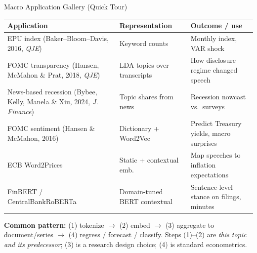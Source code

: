 \begin{frame}{Macro Application Gallery (Quick Tour)}
\begin{center}
\renewcommand{\arraystretch}{1.15}
\scriptsize
\begin{tabular}{|p{3.6cm}|p{4.4cm}|p{5.8cm}|}
\hline
\textbf{Application} & \textbf{Representation} & \textbf{Outcome / use} \\
\hline
EPU index (Baker--Bloom--Davis, 2016, \emph{QJE}) & Keyword counts & Monthly index, VAR shock \\
\hline
FOMC transparency (Hansen, McMahon \& Prat, 2018, \emph{QJE}) & LDA topics over transcripts & How disclosure regime changed speech \\
\hline
News-based recession (Bybee, Kelly, Manela \& Xiu, 2024, \emph{J. Finance}) & Topic shares from news & Recession nowcast vs.\ surveys \\
\hline
FOMC sentiment (Hansen \& McMahon, 2016) & Dictionary + Word2Vec & Predict Treasury yields, macro surprises \\
\hline
ECB Word2Prices & Static + contextual emb. & Map speeches to inflation expectations \\
\hline
FinBERT / CentralBankRoBERTa & Domain-tuned BERT contextual & Sentence-level stance on filings, minutes \\
\hline
\end{tabular}
\end{center}

\smallskip
\textbf{Common pattern:} (1) tokenize $\to$ (2) embed $\to$ (3) aggregate to document/series $\to$ (4) regress / forecast / classify. Steps (1)--(2) are \emph{this topic and its predecessor}; (3) is a research design choice; (4) is standard econometrics.
\end{frame}

